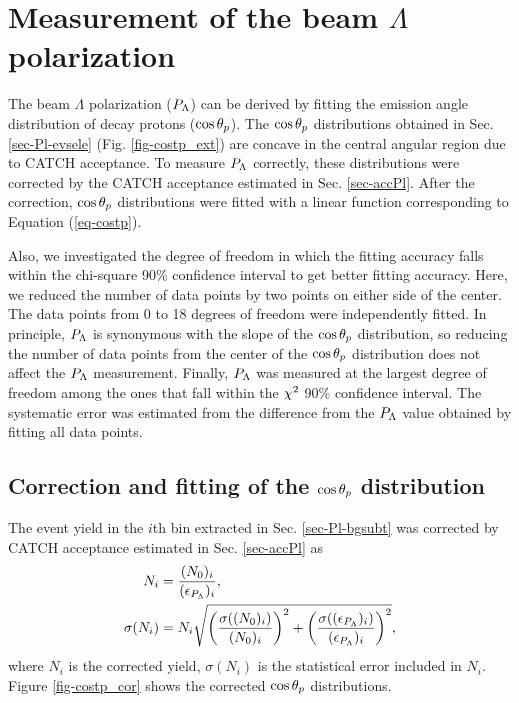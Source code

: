 \clearpage
\section{Measurement of the beam $\Lambda$ polarization}
\label{sec-Plmeas}

The beam $\Lambda$ polarization ($P_{\Lambda}$) can be derived by fitting the emission angle distribution of decay protons ($\cos{\theta_p}$). The $\cos{\theta_p}$ distributions obtained in Sec. \ref{sec-Pl-evsele} (Fig. \ref{fig-costp_ext}) are concave in the central angular region due to CATCH acceptance. To measure $P_{\Lambda}$ correctly, these distributions were corrected by the CATCH acceptance estimated in Sec. \ref{sec-accPl}. After the correction, $\cos{\theta_p}$ distributions were fitted with a linear function corresponding to Equation (\ref{eq-costp}). 

Also, we investigated the degree of freedom in which the fitting accuracy falls within the chi-square 90\% confidence interval to get better fitting accuracy. Here, we reduced the number of data points by two points on either side of the center. The data points from 0 to 18 degrees of freedom were independently fitted. In principle, $P_{\Lambda}$ is synonymous with the slope of the $\cos{\theta_p}$ distribution, so reducing the number of data points from the center of the $\cos{\theta_p}$ distribution does not affect the $P_{\Lambda}$ measurement. Finally, $P_{\Lambda}$ was measured at the largest degree of freedom among the ones that fall within the $\chi^{2}$ 90\% confidence interval. The systematic error was estimated from the difference from the $P_{\Lambda}$ value obtained by fitting all data points. 

\subsection{Correction and fitting of the $\cos{\theta_p}$ distribution}
\label{subsec-corcostp}

The event yield in the $i$th bin extracted in Sec. \ref{sec-Pl-bgsubt} was corrected by CATCH acceptance estimated in Sec. \ref{sec-accPl} as
\begin{align}
  N_i &= \frac{(N_{0})_i}{(\epsilon_{P_{\Lambda}})_i}, \\
  \sigma(N_i) &= N_i \sqrt{\left( \frac{\sigma((N_{0})_i)}{(N_{0})_i} \right)^2 +\left( \frac{\sigma((\epsilon_{P_{\Lambda}})_i)}{(\epsilon_{P_{\Lambda}})_i} \right)^2 },  \label{eq-errNcor} \\
\end{align}
where $N_i$ is the corrected yield, $\sigma(N_i)$ is the statistical error included in $N_i$. Figure \ref{fig-costp_cor} shows the corrected $\cos{\theta_p}$ distributions.

